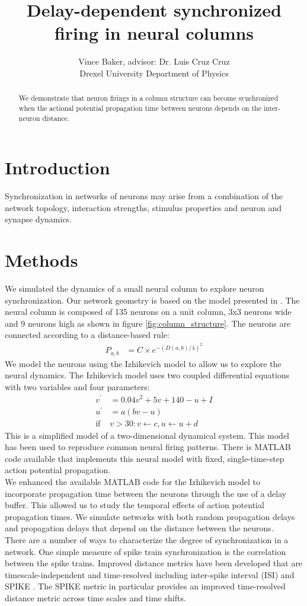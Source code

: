 \documentclass[a4paper,11pt]{article}
\title{Delay-dependent synchronized firing in neural columns}
\author{Vince Baker, advisor: Dr. Luis Cruz Cruz\\ Drexel University Department of Physics}
\begin{document}
\maketitle

\begin{abstract}
We demonstrate that neuron firings in a column structure can become synchronized when the actional potential propagation time between neurons depends on the inter-neuron distance.

\end{abstract}

\section{Introduction} 
Synchronization in networks of neurons may arise from a combination of the network topology, interaction strengths, stimulus properties and neuron and synapse dynamics.

\section{Methods}
We simulated the dynamics of a small neural column to explore neuron synchronization.
Our network geometry is based on the model presented in \cite{markram1998}.
The neural column is composed of 135 neurons on a unit column, 3x3 neurons wide and 9 neurons high as shown in figure \ref{fig:column_structure}.
The neurons are connected according to a distance-based rule:
\begin{align}\label{eq:connectivity}
 P_{a,b} &= C \times e^{-(D(a,b)/\lambda)^2}
\end{align}
We model the neurons using the Izhikevich model \cite{izhikevich2003} to allow us to explore the neural dynamics.
The Izhikevich model uses two coupled differential equations with two variables and four parameters:
\begin{align}
 v^\prime &= 0.04v^2+5v+140-u+I\\
 u^\prime &= a(bv-u)\\
 \text{if } &v>30: v\leftarrow c, u\leftarrow u+d
\end{align}
This is a simplified model of a two-dimensional dynamical system.
This model has been used to reproduce common neural firing patterns.
There is MATLAB code available that implements this neural model with fixed, single-time-step action potential propagation.
\\
We enhanced the available MATLAB code for the Izhikevich model to incorporate propagation time between the neurons through the use of a delay buffer.
This allowed us to study the temporal effects of action potential propagation times.
We simulate networks with both random propagation delays and propagation delays that depend on the distance between the neurons.
\\
There are a number of ways to characterize the degree of synchronization in a network.
One simple measure of spike train synchronization is the correlation between the spike trains.
Improved distance metrics have been developed that are timescale-independent and time-resolved including inter-spike interval (ISI) and SPIKE \cite{kreuz2012}.
The SPIKE metric in particular provides an improved time-resolved distance metric across time scales and time shifts.
\end{document}
